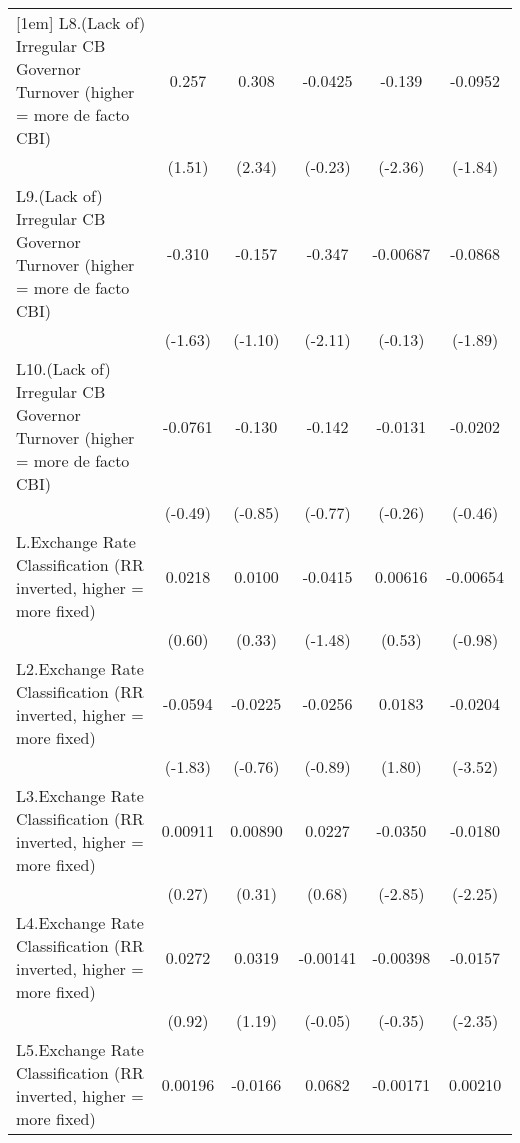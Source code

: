 {\begin{longtable}{l*{5}{c}}
[1em]
L8.(Lack of) Irregular CB Governor Turnover (higher = more de facto CBI)&    0.257         &    0.308\sym{*}  &  -0.0425         &   -0.139\sym{*}  &  -0.0952         \\
                &   (1.51)         &   (2.34)         &  (-0.23)         &  (-2.36)         &  (-1.84)         \\
[1em]
L9.(Lack of) Irregular CB Governor Turnover (higher = more de facto CBI)&   -0.310         &   -0.157         &   -0.347\sym{*}  & -0.00687         &  -0.0868         \\
                &  (-1.63)         &  (-1.10)         &  (-2.11)         &  (-0.13)         &  (-1.89)         \\
[1em]
L10.(Lack of) Irregular CB Governor Turnover (higher = more de facto CBI)&  -0.0761         &   -0.130         &   -0.142         &  -0.0131         &  -0.0202         \\
                &  (-0.49)         &  (-0.85)         &  (-0.77)         &  (-0.26)         &  (-0.46)         \\
[1em]
L.Exchange Rate Classification (RR inverted, higher = more fixed)&   0.0218         &   0.0100         &  -0.0415         &  0.00616         & -0.00654         \\
                &   (0.60)         &   (0.33)         &  (-1.48)         &   (0.53)         &  (-0.98)         \\
[1em]
L2.Exchange Rate Classification (RR inverted, higher = more fixed)&  -0.0594         &  -0.0225         &  -0.0256         &   0.0183         &  -0.0204\sym{***}\\
                &  (-1.83)         &  (-0.76)         &  (-0.89)         &   (1.80)         &  (-3.52)         \\
[1em]
L3.Exchange Rate Classification (RR inverted, higher = more fixed)&  0.00911         &  0.00890         &   0.0227         &  -0.0350\sym{**} &  -0.0180\sym{*}  \\
                &   (0.27)         &   (0.31)         &   (0.68)         &  (-2.85)         &  (-2.25)         \\
[1em]
L4.Exchange Rate Classification (RR inverted, higher = more fixed)&   0.0272         &   0.0319         & -0.00141         & -0.00398         &  -0.0157\sym{*}  \\
                &   (0.92)         &   (1.19)         &  (-0.05)         &  (-0.35)         &  (-2.35)         \\
[1em]
L5.Exchange Rate Classification (RR inverted, higher = more fixed)&  0.00196         &  -0.0166         &   0.0682\sym{**} & -0.00171         &  0.00210         \\

\end{longtable}}
